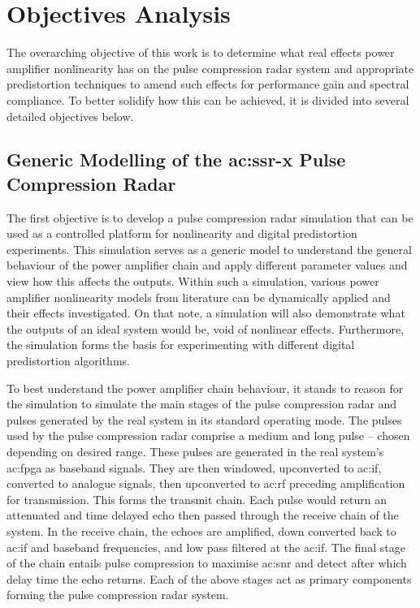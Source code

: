 \section{Objectives Analysis}\label{sec:objectives_analysis}

The overarching objective of this work is to determine what real effects power amplifier nonlinearity has on the pulse compression radar system and appropriate predistortion techniques to amend such effects for performance gain and spectral compliance. To better solidify how this can be achieved, it is divided into several detailed objectives below.

\subsection{Generic Modelling of the \gls{ac:ssr-x} Pulse Compression Radar}

The first objective is to develop a pulse compression radar simulation that can be used as a controlled platform for nonlinearity and digital predistortion experiments. This simulation serves as a generic model to understand the general behaviour of the power amplifier chain and apply different parameter values and view how this affects the outputs. Within such a simulation, various power amplifier nonlinearity models from literature can be dynamically applied and their effects investigated. On that note, a simulation will also demonstrate what the outputs of an ideal system would be, void of nonlinear effects. Furthermore, the simulation forms the basis for experimenting with different digital predistortion algorithms. 

To best understand the power amplifier chain behaviour, it stands to reason for the simulation to simulate the main stages of the pulse compression radar and pulses generated by the real system in its standard operating mode. The pulses used by the pulse compression radar comprise a medium and long pulse – chosen depending on desired range. These pulses are generated in the real system’s \gls{ac:fpga} as baseband signals. They are then windowed, upconverted to \gls{ac:if}, converted to analogue signals, then upconverted to \gls{ac:rf} preceding amplification for transmission. This forms the transmit chain. Each pulse would return an attenuated and time delayed echo then passed through the receive chain of the system. In the receive chain, the echoes are amplified, down converted back to \gls{ac:if} and baseband frequencies, and low pass filtered at the \gls{ac:if}. The final stage of the chain entails pulse compression to maximise \gls{ac:snr} and detect after which delay time the echo returns. Each of the above stages act as primary components forming the pulse compression radar system.


